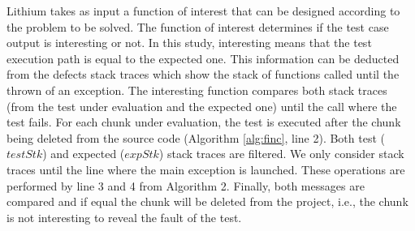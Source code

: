 \documentclass{article}
\begin{document}
%
%
%
%
%

Lithium takes as input a function of interest that can be designed according to the problem to be solved. The function of interest determines if the test case output is interesting or not. In this study, interesting means that the test execution path is equal to the expected one. This information can be deducted from the defects stack traces which show the stack of functions called until the thrown of an exception. The interesting function compares both stack traces (from the test under evaluation and the expected one) until the call where the test fails. For each chunk under evaluation, the test is executed after the chunk being deleted from the source code (Algorithm \ref{alg:finc}, line 2). Both test ($testStk$) and expected ($expStk$) stack traces are filtered. We only consider stack traces until the line where the main exception is launched. These operations are performed by line 3 and 4 from Algorithm 2. Finally, both messages are compared and if equal the chunk will be deleted from the project, i.e., the chunk is not interesting to reveal the fault of the test.
\end{document}
